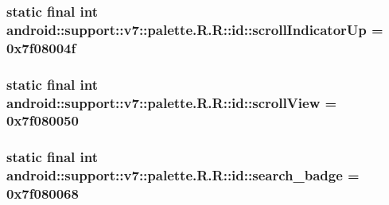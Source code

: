\hypertarget{classandroid_1_1support_1_1v7_1_1palette_1_1_r_1_1id_419193f6943b061cd3ac2cd2597469a9}{
\subsubsection[{scrollIndicatorUp}]{\setlength{\rightskip}{0pt plus 5cm}static final int android::support::v7::palette.R.R::id::scrollIndicatorUp = 0x7f08004f}}
\label{classandroid_1_1support_1_1v7_1_1palette_1_1_r_1_1id_419193f6943b061cd3ac2cd2597469a9}


\hypertarget{classandroid_1_1support_1_1v7_1_1palette_1_1_r_1_1id_d00930083701a47938eb93cdd1c21bf8}{
\subsubsection[{scrollView}]{\setlength{\rightskip}{0pt plus 5cm}static final int android::support::v7::palette.R.R::id::scrollView = 0x7f080050}}
\label{classandroid_1_1support_1_1v7_1_1palette_1_1_r_1_1id_d00930083701a47938eb93cdd1c21bf8}


\hypertarget{classandroid_1_1support_1_1v7_1_1palette_1_1_r_1_1id_b6ca7998cba35940baa798973f8e8f1a}{
\subsubsection[{search\_\-badge}]{\setlength{\rightskip}{0pt plus 5cm}static final int android::support::v7::palette.R.R::id::search\_\-badge = 0x7f080068}}
\label{classandroid_1_1support_1_1v7_1_1palette_1_1_r_1_1id_b6ca7998cba35940baa798973f8e8f1a}


